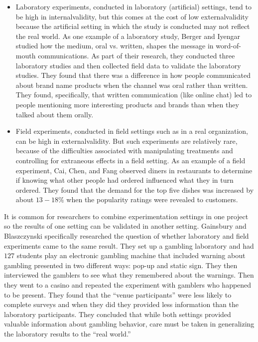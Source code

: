 \begin{itemize}
	\item Laboratory experiments, conducted in laboratory (artificial) settings, tend to be high in \gls{internalvalidity}, but this comes at the cost of low \gls{externalvalidity} because the artificial setting in which the study is conducted may not reflect the real world. As one example of a laboratory study, Berger and Iyengar\cite{berger2013communication} studied how the medium, oral vs. written, shapes the message in word-of-mouth communications. As part of their research, they conducted three laboratory studies and then collected field data to validate the laboratory studies. They found that there was a difference in how people communicated about brand name products when the channel was oral rather than written. They found, specifically, that written communication (like online chat) led to people mentioning more interesting products and brands than when they talked about them orally.
	\item Field experiments, conducted in field settings such as in a real organization, can be high in \gls{externalvalidity}. But such experiments are relatively rare, because of the difficulties associated with manipulating treatments and controlling for extraneous effects in a field setting. As an example of a field experiment, Cai, Chen, and Fang\cite{cai2009observational} observed diners in restaurants to determine if knowing what other people had ordered influenced what they in turn ordered. They found that the demand for the top five dishes was increased by about $ 13 - 18\% $ when the popularity ratings were revealed to customers. 
\end{itemize}

It is common for researchers to combine experimentation settings in one project so the results of one setting can be validated in another setting. Gainsbury and Blaszczynski\cite{gainsbury2011appropriateness} specifically researched the question of whether laboratory and field experiments came to the same result. They set up a gambling laboratory and had $ 127 $ students play an electronic gambling machine that included warning about gambling presented in two different ways: pop-up and static sign. They then interviewed the gamblers to see what they remembered about the warnings. Then they went to a casino and repeated the experiment with gamblers who happened to be present. They found that the ``venue participants'' were less likely to complete surveys and when they did they provided less information than the laboratory participants. They concluded that while both settings provided valuable information about gambling behavior, care must be taken in generalizing the laboratory results to the ``real world.''

